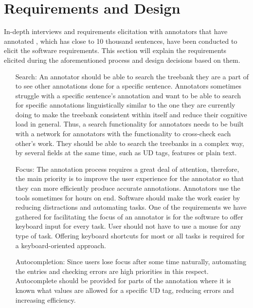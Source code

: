 \section{Requirements and Design}
\label{sec:requirements}

In-depth interviews and requirements elicitation with annotators that have annotated \bountreebank{}, which has close to 10 thousand sentences, have been conducted to elicit the software requirements.
This section will explain the requirements elicited during the aforementioned process and design decisions based on them.

\begin{itemize}[before=\normalfont, font=\itshape, align=left]
\item[Search:]
An annotator should be able to search the treebank they are a part of to see other annotations done for a specific sentence.
Annotators sometimes struggle with a specific sentence's annotation and want to be able to search for specific annotations linguistically similar to the one they are currently doing to make the treebank consistent within itself and reduce their cognitive load in general.
Thus, a search functionality for annotators needs to be built with a network for annotators with the functionality to cross-check each other's work.
They should be able to search the treebanks in a complex way, by several fields at the same time, such as UD tags, features or plain text.

\item[Focus:]
The annotation process requires a great deal of attention, therefore, the main priority is to improve the user experience for the annotator so that they can more efficiently produce accurate annotations.
Annotators use the tools sometimes for hours on end.
Software should make the work easier by reducing distractions and automating tasks.
One of the requirements we have gathered for facilitating the focus of an annotator is for the software to offer keyboard input for every task.
User should not have to use a mouse for any type of task.
Offering keyboard shortcuts for most or all tasks is required for a keyboard-oriented approach.

\item[Autocompletion:]
Since users lose focus after some time naturally, automating the entries and checking errors are high priorities in this respect.
Autocomplete should be provided for parts of the annotation where it is known what values are allowed for a specific UD tag, reducing errors and increasing efficiency.


\end{itemize}
